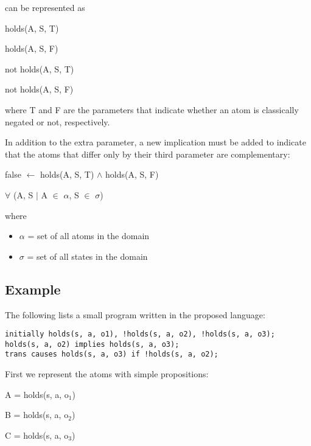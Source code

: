 \documentclass[a4paper,draft]{article}
\begin{document}
      can be represented as

      \begin{list}{}{}
        \item holds(A, S, T)
        \item holds(A, S, F)
        \item not holds(A, S, T)
        \item not holds(A, S, F)
      \end{list}

      where T and F are the parameters that indicate whether an atom is
      classically negated or not, respectively.

      In addition to the extra parameter, a new implication must be added
      to indicate that the atoms that differ only by their third parameter
      are complementary:

      \begin{list}{}{}
        \item false $\leftarrow$ holds(A, S, T) $\land$ holds(A, S, F)
      \end{list}

      $\forall$ (A, S $\mid$ A $\in$ $\alpha$, S $\in$ $\sigma$)

      where

      \begin{itemize}
        \item $\alpha$ = set of all atoms in the domain
        \item $\sigma$ = set of all states in the domain
      \end{itemize}

    \subsection{Example}

      The following lists a small program written in the proposed language:

      \begin{verbatim}
initially holds(s, a, o1), !holds(s, a, o2), !holds(s, a, o3);
holds(s, a, o2) implies holds(s, a, o3);
trans causes holds(s, a, o3) if !holds(s, a, o2);
      \end{verbatim}

      First we represent the atoms with simple propositions:

      \begin{list}{}{}
        \item A = holds(s, a, o$_{1}$)
        \item B = holds(s, a, o$_{2}$)
        \item C = holds(s, a, o$_{3}$)
      \end{list}
\end{document}
